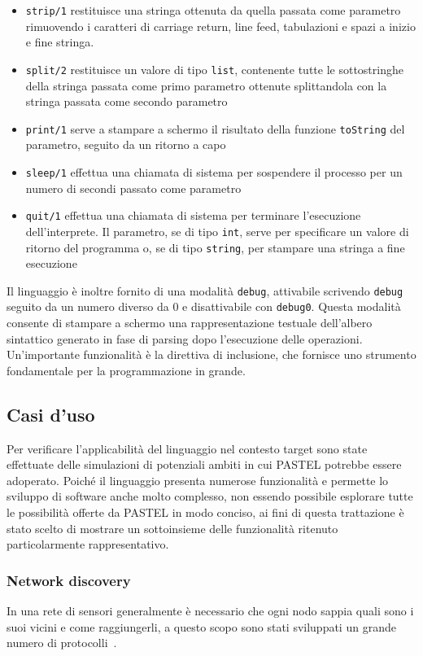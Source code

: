 \documentclass[10pt]{article}
\begin{document}
\begin{itemize}
\item \texttt{strip/1} restituisce una stringa ottenuta da quella passata come parametro rimuovendo i caratteri di carriage return, line feed, tabulazioni e spazi a inizio e fine stringa.
\item \texttt{split/2} restituisce un valore di tipo \texttt{list}, contenente tutte le sottostringhe della stringa passata come primo parametro ottenute splittandola con la stringa passata come secondo parametro
\item \texttt{print/1} serve a stampare a schermo il risultato della funzione \texttt{toString} del parametro, seguito da un ritorno a capo
\item \texttt{sleep/1} effettua una chiamata di sistema per sospendere il processo per un numero di secondi passato come parametro
\item \texttt{quit/1} effettua una chiamata di sistema per terminare l'esecuzione dell'interprete. Il parametro, se di tipo \texttt{int}, serve per specificare un valore di ritorno del programma o, se di tipo \texttt{string}, per stampare una stringa a fine esecuzione
\end{itemize}

Il linguaggio è inoltre fornito di una modalità \texttt{debug}, attivabile scrivendo \texttt{debug} seguito da un numero diverso da 0 e disattivabile con \texttt{debug0}. Questa modalità consente di stampare a schermo una rappresentazione testuale dell'albero sintattico generato in fase di parsing dopo l'esecuzione delle operazioni. \\
Un'importante funzionalità è la direttiva di inclusione, che fornisce uno strumento fondamentale per la programmazione in grande.


\subsection{Casi d'uso}\label{subsection:casi-d_uso}
Per verificare l'applicabilità del linguaggio nel contesto target sono state effettuate delle simulazioni di potenziali ambiti in cui PASTEL potrebbe essere adoperato. Poiché il linguaggio presenta numerose funzionalità e permette lo sviluppo di software anche molto complesso, non essendo possibile esplorare tutte le possibilità offerte da PASTEL in modo conciso, ai fini di questa trattazione è stato scelto di mostrare un sottoinsieme delle funzionalità ritenuto particolarmente rappresentativo.

\subsubsection{Network discovery}\label{subsubsection:net-disc}
In una rete di sensori generalmente è necessario che ogni nodo sappia quali sono i suoi vicini e come raggiungerli, a questo scopo sono stati sviluppati un grande numero di protocolli~\cite{narten1998neighbor, kandhalu2010u, alsa2012secure}.
\end{document}
